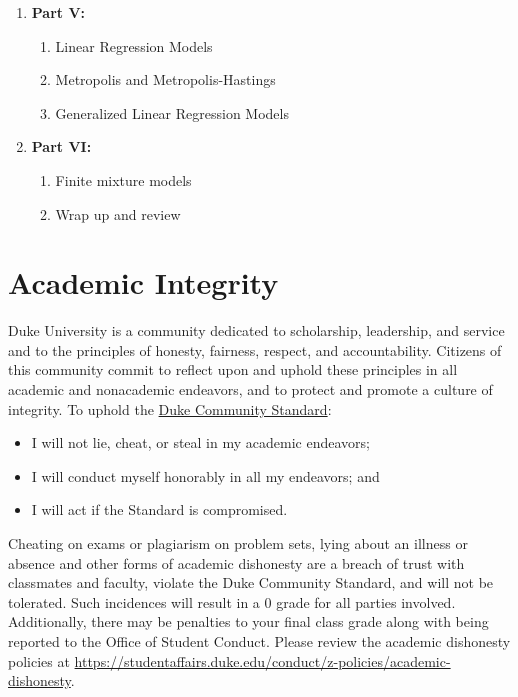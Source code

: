 \documentclass[11pt, a4paper]{article}
\begin{document}
\begin{enumerate}[label= {\color{darkblue}{\ArrowBoldRightStrobe}}]
\begin{enumerate}[label= {\color{cyan}{\Rectangle}}]
	\end{enumerate}
	\item \textbf{Part V: }
	\begin{enumerate}[label= {\color{cyan}{\Rectangle}}]
		\item Linear Regression Models
		\item Metropolis and Metropolis-Hastings
		\item Generalized Linear Regression Models
	\end{enumerate}
	\item \textbf{Part VI: }
	\begin{enumerate}[label= {\color{cyan}{\Rectangle}}]
		\item Finite mixture models
		\item Wrap up and review
	\end{enumerate}
\end{enumerate}


\section{Academic Integrity}  
Duke University is a community dedicated to scholarship, leadership, and service and to the principles of honesty, fairness, respect, and accountability. Citizens of this community commit to reflect upon and uphold these principles in all academic and nonacademic endeavors, and to protect and promote a culture of integrity. To uphold the \href{https://studentaffairs.duke.edu/conduct/about-us/duke-community-standard}{Duke Community Standard}:
\begin{itemize}[label= {\color{darkred}{\Large \HandRight}}]
	\item I will not lie, cheat, or steal in my academic endeavors;
	\item I will conduct myself honorably in all my endeavors; and
	\item I will act if the Standard is compromised.
\end{itemize}

Cheating on exams or plagiarism on problem sets, lying about an illness or absence and other forms of academic dishonesty are a breach of trust with classmates and faculty, violate the Duke Community Standard, and will not be tolerated. Such incidences will result in a 0 grade for all parties involved. Additionally, there may be penalties to your final class grade along with being reported to the Office of Student Conduct. Please review the academic dishonesty policies at \url{https://studentaffairs.duke.edu/conduct/z-policies/academic-dishonesty}.
\end{document}
